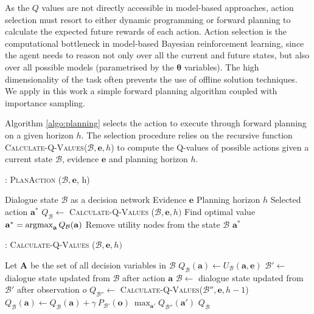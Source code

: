  As the $Q$ values are not directly accessible in model-based approaches, action selection must resort to either dynamic programming or forward planning to calculate the expected future rewards of each action.  Action selection is the computational bottleneck in model-based Bayesian reinforcement learning, since the agent needs to reason not only over all the current and future states, but also over all possible models (parametrised by the $\boldsymbol\theta$ variables).  The high dimensionality of the task often prevents the use of offline solution techniques. We apply in this work a simple forward planning algorithm coupled with importance sampling. 


Algorithm \ref{algo:planning} selects the action to execute through forward planning on a given horizon $h$.  The selection procedure relies on the recursive function \textsc{Calculate-Q-Values}($\mathcal{B}, \mathbf{e}, h$) to compute the Q-values of possible actions given a current state $\mathcal{B}$, evidence $\mathbf{e}$ and planning horizon $h$.  

\begin{algorithm}[h!]
\caption{: \textsc{PlanAction} ($\mathcal{B}, \mathbf{e}$, h) }
\begin{algorithmic}[1] \vspace{1mm}
\REQUIRE Dialogue state $\mathcal{B}$ as a decision network
\REQUIRE Evidence $\mathbf{e}$
\REQUIRE Planning horizon $h$
\ENSURE Selected action $\mathbf{a}^*$
\STATE $Q_{\mathcal{B}} \leftarrow $ \textsc{Calculate-Q-Values} ($\mathcal{B}, \mathbf{e}, h)$
\STATE Find optimal value $\mathbf{a}^* = \argmax_{\mathbf{a}} Q_{\mathcal{B}}(\mathbf{a})$
\STATE Remove utility nodes from the state $\mathcal{B}$
\RETURN $\mathbf{a}^*$
\end{algorithmic}
\label{algo:planning}
\end{algorithm}


\begin{algorithm}[h!]
\caption{: \textsc{Calculate-Q-Values} ($\mathcal{B}, \mathbf{e}, h)$}
\begin{algorithmic}[1] \vspace{1mm}
\STATE Let $\mathbf{A}$ be the set of all decision variables in $\mathcal{B}$
\STATE $Q_{\mathcal{B}}(\mathbf{a}) \leftarrow U_{\mathcal{B}}(\mathbf{a}, \mathbf{e})$
\STATE $\mathcal{B}' \leftarrow $ dialogue state updated from $\mathcal{B}$ after action $\mathbf{a}$
\STATE $\mathcal{B} \leftarrow $ dialogue state updated from $\mathcal{B}'$ after observation $o$
\STATE $Q_{\mathcal{B}''} \leftarrow $ \textsc{Calculate-Q-Values}($\mathcal{B}'', \mathbf{e}, h -1$)
\STATE $Q_{\mathcal{B}}(\mathbf{a}) \leftarrow Q_{\mathcal{B}}(\mathbf{a}) + \gamma \ P_{\mathcal{B}'}(\mathbf{o}) \ \max_{\mathbf{a}'} Q_{\mathcal{B}''}(\mathbf{a}')$
\ENDFOR
\ENDIF
\ENDFOR
\RETURN $Q_{\mathcal{B}}$
\end{algorithmic} 
\label{algo:qval}
\end{algorithm}

